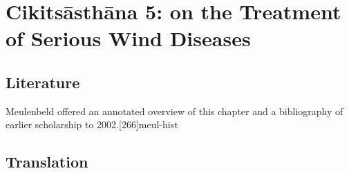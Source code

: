 
\chapter{Cikitsāsthāna 5:  on the Treatment of Serious Wind 
Diseases}

\section{Literature} 

Meulenbeld offered an annotated overview of this chapter and a bibliography
of earlier scholarship to 2002.[266]{meul-hist} 

\section{Translation}

